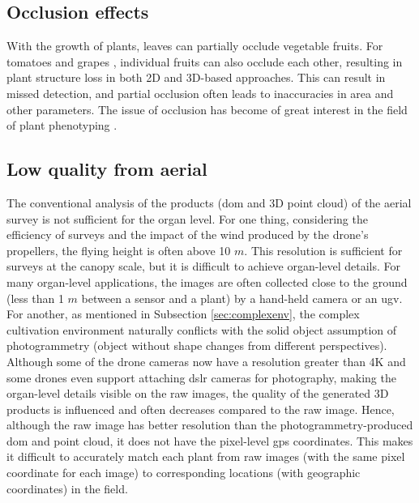 \subsection{Occlusion effects}
With the growth of plants, leaves can partially occlude vegetable fruits. For tomatoes \citep{yamamoto_plant_2014} and grapes \citep{liang_segmentation_2022}, individual fruits can also occlude each other, resulting in plant structure loss in both 2D and 3D-based approaches. This can result in missed detection, and partial occlusion often leads to inaccuracies in area and other parameters. The issue of occlusion has become of great interest in the field of plant phenotyping \citep{blok_image_2021, boogaard_robust_2020, lehnert_3d_2019}.

\subsection{Low quality from aerial}
The conventional analysis of the products (\gls{dom} and 3D point cloud) of the aerial survey is not sufficient for the organ level. 
For one thing, considering the efficiency of surveys and the impact of the wind produced by the drone's propellers, the flying height is often above 10 $m$. This resolution is sufficient for surveys at the canopy scale, but it is difficult to achieve organ-level details. For many organ-level applications, the images are often collected close to the ground (less than 1 $m$ between a sensor and a plant) by a hand-held camera or an \acrfull{ugv}.
For another, as mentioned in Subsection \ref{sec:complexenv}, the complex cultivation environment naturally conflicts with the solid object assumption of photogrammetry (object without shape changes from different perspectives). Although some of the drone cameras now have a resolution greater than 4K and some drones even support attaching \gls{dslr} cameras for photography, making the organ-level details visible on the raw images, the quality of the generated 3D products is influenced and often decreases compared to the raw image.
Hence, although the raw image has better resolution than the photogrammetry-produced \gls{dom} and point cloud, it does not have the pixel-level \gls{gps} coordinates. This makes it difficult to accurately match each plant from raw images (with the same pixel coordinate for each image) to corresponding locations (with geographic coordinates) in the field.
